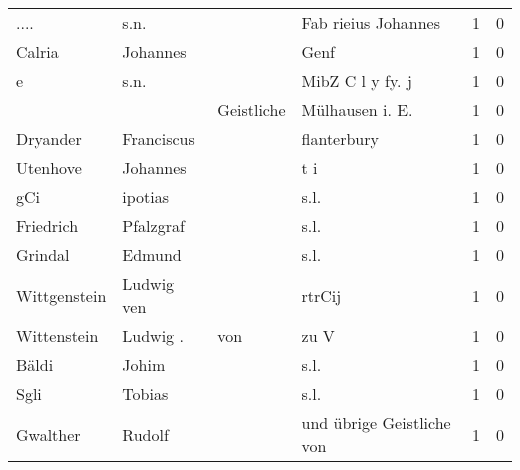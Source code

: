 \begin{center}
\begin{tiny}
\begin{longtabu}{llllrr}
                     .... &                               s.n. &             &                         Fab rieius Johannes &          1 &         0 \\
                   Calria &                           Johannes &             &                                        Genf &          1 &         0 \\
                        e &                               s.n. &             &                            MibZ C l y fy. j &          1 &         0 \\
                          &                                    &  Geistliche &                            Mülhausen i. E.  &          1 &         0 \\
                 Dryander &                         Franciscus &             &                                 flanterbury &          1 &         0 \\
                 Utenhove &                           Johannes &             &                                         t i &          1 &         0 \\
                      gCi &                            ipotias &             &                                        s.l. &          1 &         0 \\
                Friedrich &                          Pfalzgraf &             &                                        s.l. &          1 &         0 \\
                  Grindal &                             Edmund &             &                                        s.l. &          1 &         0 \\
             Wittgenstein &                         Ludwig ven &             &                                      rtrCij &          1 &         0 \\
              Wittenstein &                           Ludwig . &         von &                                        zu V &          1 &         0 \\
                    Bäldi &                              Johim &             &                                        s.l. &          1 &         0 \\
                     Sgli &                             Tobias &             &                                        s.l. &          1 &         0 \\
                 Gwalther &                             Rudolf &             &                   und übrige Geistliche von &          1 &         0 \\

\end{longtabu}
\end{tiny}
\end{center}
